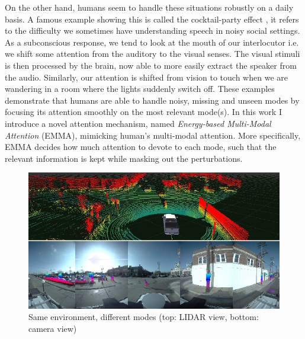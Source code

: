 On the other hand, humans seem to handle these situations robustly on a daily basis. A famous example showing this is called the cocktail-party effect \citep{cocktail-party}, it refers to the difficulty we sometimes have understanding speech in noisy social settings. As a subconscious response, we tend to look at the mouth of our interlocutor i.e. we shift some attention from the auditory to the visual senses. The visual stimuli is then processed by the brain, now able to more easily extract the speaker from the audio. Similarly, our attention is shifted from vision to touch when we are wandering in a room where the lights suddenly switch off. These examples demonstrate that humans are able to handle noisy, missing and unseen modes by focusing its attention smoothly on the most relevant mode(s). In this work I introduce a novel attention mechanism, named \textit{Energy-based Multi-Modal Attention} (EMMA), mimicking human's multi-modal attention. More specifically, EMMA decides how much attention to devote to each mode, such that the relevant information is kept while masking out the perturbations.
\begin{figure}[!ht]
\centering
\includegraphics[scale=0.55]{figures/lidar-camera}
\caption[Lidar \& Camera view in self-driving cars]{Same environment, different modes (top: LIDAR view, bottom: camera view)}	
\label{fig:lidar-camera}
\end{figure}



